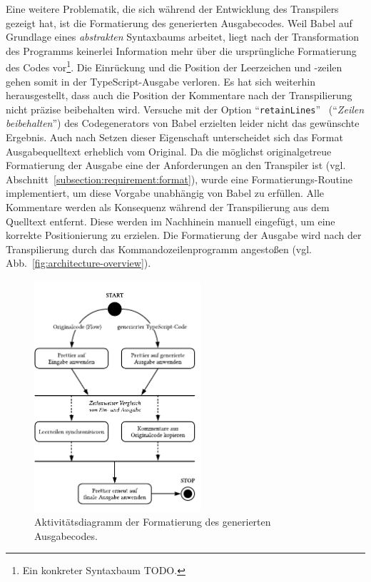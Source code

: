Eine weitere Problematik, die sich während der Entwicklung des Transpilers gezeigt hat, ist die Formatierung des generierten Ausgabecodes. Weil Babel auf Grundlage eines \emph{abstrakten} Syntaxbaums arbeitet, liegt nach der Transformation des Programms keinerlei Information mehr über die ursprüngliche Formatierung des Codes vor\footnote{Ein konkreter Syntaxbaum TODO.}. Die Einrückung und die Position der Leerzeichen und -zeilen gehen somit in der TypeScript-Ausgabe verloren. Es hat sich weiterhin herausgestellt, dass auch die Position der Kommentare nach der Transpilierung nicht präzise beibehalten wird. Versuche mit der Option \enquote{\texttt{retainLines}}~\autocite{BABEL:GENERATOR} (\enquote{\textit{Zeilen beibehalten}}) des Codegenerators von Babel erzielten leider nicht das gewünschte Ergebnis. Auch nach Setzen dieser Eigenschaft unterscheidet sich das Format Ausgabequelltext erheblich vom Original. Da die möglichst originalgetreue Formatierung der Ausgabe eine der Anforderungen an den Transpiler ist (vgl. Abschnitt~\ref{subsection:requirement:format}), wurde eine Formatierungs-Routine implementiert, um diese Vorgabe unabhängig von Babel zu erfüllen. Alle Kommentare werden als Konsequenz während der Transpilierung aus dem Quelltext entfernt. Diese werden im Nachhinein manuell eingefügt, um eine korrekte Positionierung zu erzielen. Die Formatierung der Ausgabe wird nach der Transpilierung durch das Kommandozeilenprogramm angestoßen (vgl. Abb.~\ref{fig:architecture-overview}).

\begin{figure}[htb]
  \centering
  \includegraphics[width=0.55\textwidth]{src/4_Umsetzung/fig/activity-diagram-formatting.pdf}
	\caption[Aktivitätsdiagramm der Formatierung des Ausgabecodes]{Aktivitätsdiagramm der Formatierung des generierten Ausgabecodes.}
	\label{fig:activity-diagram-formatting}
\end{figure}

